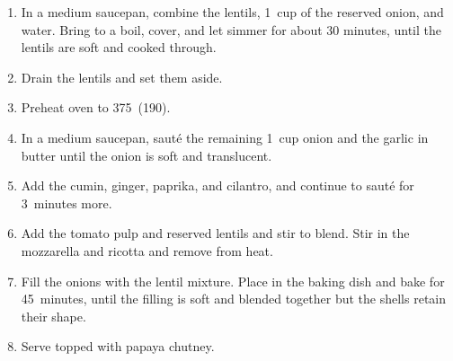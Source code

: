 
\begin{ingredients}
\end{ingredients}

\begin{recipe}
  \begin{enumerate} 

  \item In a medium saucepan, combine the lentils, 1~cup of the
  reserved onion, and water. Bring to a boil, cover, and let simmer
  for about 30 minutes, until the lentils are soft and cooked through.

  \item Drain the lentils and set them aside.

  \item Preheat oven to 375\F\ (190\degreeC).

  \item In a medium saucepan, saut\'e the remaining 1~cup onion and
  the garlic in butter until the onion is soft and translucent.

  \item Add the cumin, ginger, paprika, and cilantro, and continue to
  saut\'e for 3~minutes more.

  \item Add the tomato pulp and reserved lentils and stir to blend.
  Stir in the mozzarella and ricotta and remove from heat.

  \item Fill the onions with the lentil mixture.  Place in the baking
  dish and bake for 45~minutes, until the filling is soft and blended
  together but the shells retain their shape.

  \item Serve topped with papaya chutney.

  \end{enumerate}
\end{recipe}


